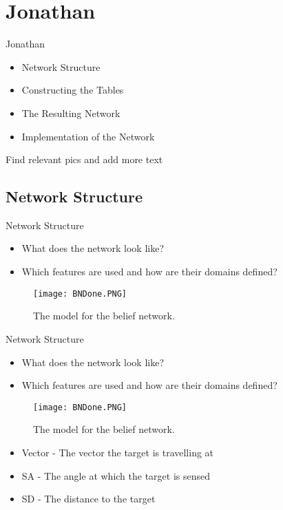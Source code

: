 \section{Jonathan}
\begin{frame}{Jonathan}
\begin{itemize}
\item Network Structure
\item Constructing the Tables
\item The Resulting Network
\item Implementation of the Network
\end{itemize}
Find relevant pics and add more text
\end{frame}

\subsection{Network Structure}
\begin{frame}{Network Structure}
\begin{itemize}
\item What does the network look like?
\item Which features are used and how are their domains defined?
\end{itemize}
\begin{figure}
  \texttt{[image: BNDone.PNG]}
  \caption{The model for the belief network.}
  \label{fig:BNDone}
\end{figure}
\end{frame}

\begin{frame}{Network Structure}
\begin{itemize}
\item What does the network look like?
\item Which features are used and how are their domains defined?
\end{itemize}

\begin{figure}
  \texttt{[image: BNDone.PNG]}
  \caption{The model for the belief network.}
  \label{fig:BNDone}
\end{figure}


\begin{itemize}
  \item Vector - The vector the target is travelling at
  \item SA - The angle at which the target is sensed
  \item SD - The distance to the target
\end{itemize}
\end{frame}

